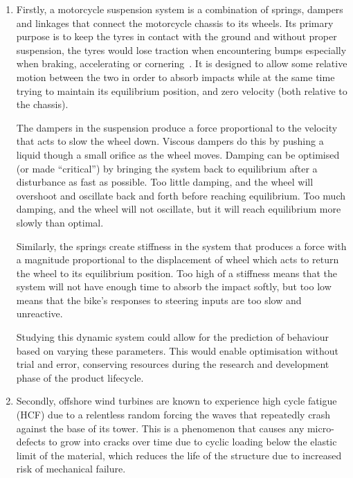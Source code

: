 \documentclass[12pt]{article}
\begin{document}
    \begin{enumerate}[listparindent=\parindent]
        \item Firstly, a motorcycle suspension system is a combination of springs, dampers and linkages that connect the motorcycle chassis to its wheels.
        Its primary purpose is to keep the tyres in contact with the ground and without proper suspension, the tyres would lose traction when encountering bumps especially when braking, accelerating or cornering~\cite{UTI2020MotorcycleSuspension}.
        It is designed to allow some relative motion between the two in order to absorb impacts while at the same time trying to maintain its equilibrium position, and zero velocity (both relative to the chassis).

        The dampers in the suspension produce a force proportional to the velocity that acts to slow the wheel down.
        Viscous dampers do this by pushing a liquid though a small orifice as the wheel moves.
        Damping can be optimised (or made ``critical'') by bringing the system back to equilibrium after a disturbance as fast as possible.
        Too little damping, and the wheel will overshoot and oscillate back and forth before reaching equilibrium.
        Too much damping, and the wheel will not oscillate, but it will reach equilibrium more slowly than optimal.

        Similarly, the springs create stiffness in the system that produces a force with a magnitude proportional to the displacement of wheel which acts to return the wheel to its equilibrium position.
        Too high of a stiffness means that the system will not have enough time to absorb the impact softly, but too low means that the bike's responses to steering inputs are too slow and unreactive.

        Studying this dynamic system could allow for the prediction of behaviour based on varying these parameters.
        This would enable optimisation without trial and error, conserving resources during the research and development phase of the product lifecycle.

        \item Secondly, offshore wind turbines are known to experience high cycle fatigue (HCF) due to a relentless random forcing the waves that repeatedly crash against the base of its tower.
        This is a phenomenon that causes any micro-defects to grow into cracks over time due to cyclic loading below the elastic limit of the material, which reduces the life of the structure due to increased risk of mechanical failure.


\end{enumerate}
\end{document}
